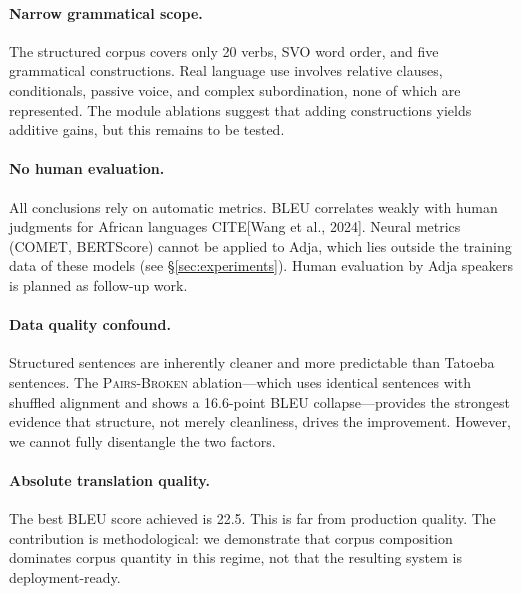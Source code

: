 \documentclass[11pt]{article}
\begin{document}
\paragraph{Narrow grammatical scope.} The structured corpus covers only 20 verbs, SVO word order, and five grammatical constructions. Real language use involves relative clauses, conditionals, passive voice, and complex subordination, none of which are represented. The module ablations suggest that adding constructions yields additive gains, but this remains to be tested.


\paragraph{No human evaluation.} All conclusions rely on automatic metrics. BLEU correlates weakly with human judgments for African languages CITE[Wang et al., 2024]. Neural metrics (COMET, BERTScore) cannot be applied to Adja, which lies outside the training data of these models (see §\ref{sec:experiments}). Human evaluation by Adja speakers is planned as follow-up work.

\paragraph{Data quality confound.} Structured sentences are inherently cleaner and more predictable than Tatoeba sentences. The \textsc{Pairs-Broken} ablation---which uses identical sentences with shuffled alignment and shows a 16.6-point BLEU collapse---provides the strongest evidence that structure, not merely cleanliness, drives the improvement. However, we cannot fully disentangle the two factors.

\paragraph{Absolute translation quality.} The best BLEU score achieved is 22.5. This is far from production quality. The contribution is methodological: we demonstrate that corpus composition dominates corpus quantity in this regime, not that the resulting system is deployment-ready.
\end{document}
